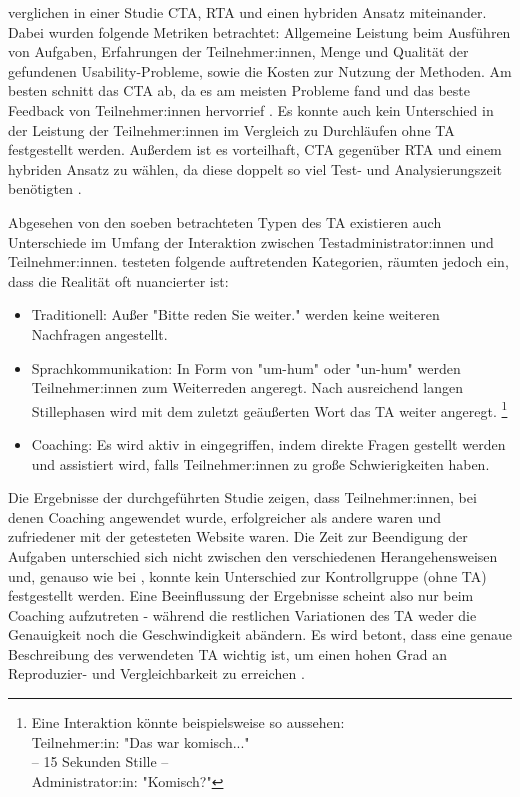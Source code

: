 \textcite{alhadretiRethinkingThinking2018} verglichen in einer Studie \ac{CTA}, \ac{RTA} und einen hybriden Ansatz miteinander. Dabei wurden folgende Metriken betrachtet: Allgemeine Leistung beim Ausführen von Aufgaben, Erfahrungen der Teilnehmer:innen, Menge und Qualität der gefundenen Usability-Probleme, sowie die Kosten zur Nutzung der Methoden. Am besten schnitt das \acl{CTA} ab, da es am meisten Probleme fand und das beste Feedback von Teilnehmer:innen hervorrief \parencite{alhadretiRethinkingThinking2018}. Es konnte auch kein Unterschied in der Leistung der Teilnehmer:innen im Vergleich zu Durchläufen ohne \ac{TA} festgestellt werden. Außerdem ist es vorteilhaft, \ac{CTA} gegenüber \ac{RTA} und einem hybriden Ansatz zu wählen, da diese doppelt so viel Test- und Analysierungszeit benötigten \parencite{alhadretiRethinkingThinking2018}.

Abgesehen von den soeben betrachteten Typen des \acl{TA} existieren auch Unterschiede im Umfang der Interaktion zwischen Testadministrator:innen und Teilnehmer:innen. \textcite{olmsted-hawalaThinkaloudProtocols2010} testeten folgende auftretenden Kategorien, räumten jedoch ein, dass die Realität oft nuancierter ist:
\begin{itemize}
  \item Traditionell: Außer "Bitte reden Sie weiter." werden keine weiteren Nachfragen angestellt.
  \item Sprachkommunikation: In Form von "um-hum" oder "un-hum" werden Teilnehmer:innen zum Weiterreden angeregt. Nach ausreichend langen Stillephasen wird mit dem zuletzt geäußerten Wort das \acl{TA} weiter angeregt. \footnote{Eine Interaktion könnte beispielsweise so aussehen:\\ Teilnehmer:in: "Das war komisch..." \\ -- 15 Sekunden Stille -- \\ Administrator:in: "Komisch?"}
  \item Coaching: Es wird aktiv in eingegriffen, indem direkte Fragen gestellt werden und assistiert wird, falls Teilnehmer:innen zu große Schwierigkeiten haben.
\end{itemize}
Die Ergebnisse der \citeyear{olmsted-hawalaThinkaloudProtocols2010} durchgeführten Studie zeigen, dass Teilnehmer:innen, bei denen Coaching angewendet wurde, erfolgreicher als andere waren und zufriedener mit der getesteten Website waren. Die Zeit zur Beendigung der Aufgaben unterschied sich nicht zwischen den verschiedenen Herangehensweisen und, genauso wie bei \citeauthor{alhadretiRethinkingThinking2018}, konnte kein Unterschied zur Kontrollgruppe (ohne \ac{TA}) festgestellt werden. Eine Beeinflussung der Ergebnisse scheint also nur beim Coaching aufzutreten - während die restlichen Variationen des \ac{TA} weder die Genauigkeit noch die Geschwindigkeit abändern. Es wird betont, dass eine genaue Beschreibung des verwendeten \acl{TA} wichtig ist, um einen hohen Grad an Reproduzier- und Vergleichbarkeit zu erreichen \parencite{alhadretiRethinkingThinking2018}.

